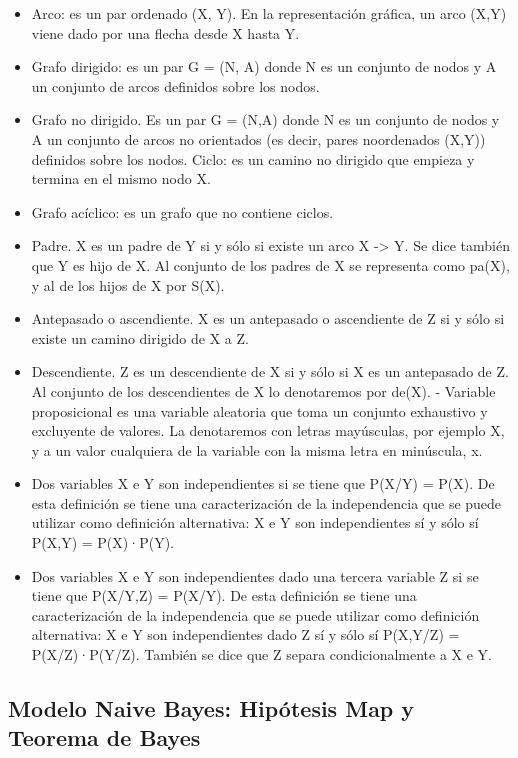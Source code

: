 \documentclass[
  a4paper,
  DIV=11,
  numbers=noendperiod]{scrreprt}
\providecommand{\tightlist}{%
  \setlength{\itemsep}{0pt}\setlength{\parskip}{0pt}}\usepackage{longtable,booktabs,array}
\begin{document}
\begin{itemize}
\tightlist
\item
  Arco: es un par ordenado (X, Y). En la representación gráfica, un arco
  (X,Y) viene dado por una flecha desde X hasta Y.
\item
  Grafo dirigido: es un par G = (N, A) donde N es un conjunto de nodos y
  A un conjunto de arcos definidos sobre los nodos.
\item
  Grafo no dirigido. Es un par G = (N,A) donde N es un conjunto de nodos
  y A un conjunto de arcos no orientados (es decir, pares noordenados
  (X,Y)) definidos sobre los nodos. Ciclo: es un camino no dirigido que
  empieza y termina en el mismo nodo X.
\item
  Grafo acíclico: es un grafo que no contiene ciclos.
\item
  Padre. X es un padre de Y si y sólo si existe un arco X
  -\textgreater{} Y. Se dice también que Y es hijo de X. Al conjunto de
  los padres de X se representa como pa(X), y al de los hijos de X por
  S(X).
\item
  Antepasado o ascendiente. X es un antepasado o ascendiente de Z si y
  sólo si existe un camino dirigido de X a Z.
\item
  Descendiente. Z es un descendiente de X si y sólo si X es un
  antepasado de Z. Al conjunto de los descendientes de X lo denotaremos
  por de(X). - Variable proposicional es una variable aleatoria que toma
  un conjunto exhaustivo y excluyente de valores. La denotaremos con
  letras mayúsculas, por ejemplo X, y a un valor cualquiera de la
  variable con la misma letra en minúscula, x.
\item
  Dos variables X e Y son independientes si se tiene que P(X/Y) = P(X).
  De esta definición se tiene una caracterización de la independencia
  que se puede utilizar como definición alternativa: X e Y son
  independientes sí y sólo sí P(X,Y) = P(X)·P(Y).
\item
  Dos variables X e Y son independientes dado una tercera variable Z si
  se tiene que P(X/Y,Z) = P(X/Y). De esta definición se tiene una
  caracterización de la independencia que se puede utilizar como
  definición alternativa: X e Y son independientes dado Z sí y sólo sí
  P(X,Y/Z) = P(X/Z)·P(Y/Z). También se dice que Z separa
  condicionalmente a X e Y.
\end{itemize}

\subsection{Modelo Naive Bayes: Hipótesis Map y Teorema de
Bayes}\label{modelo-naive-bayes-hipuxf3tesis-map-y-teorema-de-bayes}
\end{document}
